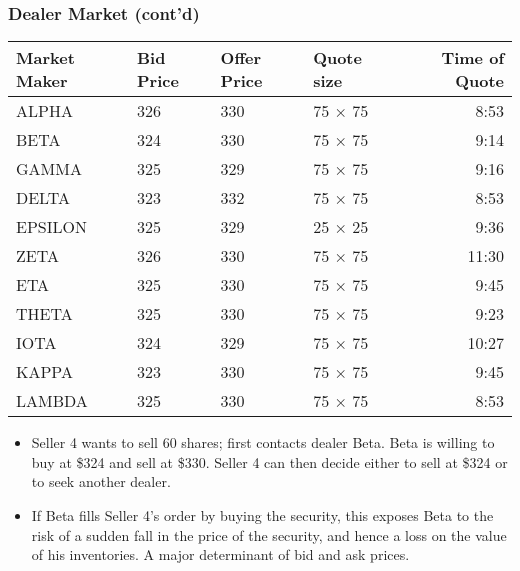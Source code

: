 \documentclass[10pt]{beamer}
\begin{document}
	\begin{frame}
		\frametitle{Dealer Market (cont'd)}
		
	{\scriptsize
		\begin{table}[]
			\begin{tabular}{llllr}
				Market Maker & Bid Price                  & Offer Price                & Quote size & Time of Quote \\ \hline
				ALPHA        & {\color[HTML]{FF0000} 326} & 330                        & 75 × 75    & 8:53                 \\
				BETA         & 324                        & 330                        & 75 × 75    & 9:14                 \\
				GAMMA        & 325                        & {\color[HTML]{FF0000} 329} & 75 × 75    & 9:16                 \\
				DELTA        & 323                        & 332                        & 75 × 75    & 8:53                 \\
				EPSILON      & 325                        & {\color[HTML]{FF0000} 329} & 25 × 25    & 9:36                 \\
				ZETA         & {\color[HTML]{FF0000} 326} & 330                        & 75 × 75    & 11:30                \\
				ETA          & 325                        & 330                        & 75 × 75    & 9:45                 \\
				THETA        & 325                        & 330                        & 75 × 75    & 9:23                 \\
				IOTA         & 324                        & {\color[HTML]{FF0000} 329} & 75 × 75    & 10:27                \\
				KAPPA        & 323                        & 330                        & 75 × 75    & 9:45                 \\
				LAMBDA       & 325                        & 330                        & 75 × 75    & 8:53                
			\end{tabular}
		\end{table}
	}
		
		
		\begin{itemize} \itemsep10pt
			\item Seller 4 wants to sell 60 shares; first contacts dealer Beta. Beta is willing to buy at \$324 and sell at \$330. Seller 4 can then decide either to sell at \$324 or to seek another dealer. 
			\item If Beta fills Seller 4’s order by buying the security, this exposes Beta to the risk of a sudden fall in the price of the security, and hence a loss on the value of his inventories. A major determinant of bid and ask prices.
			
		\end{itemize}
		
	\end{frame}
	
\end{document}
